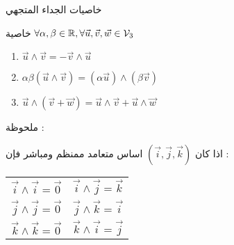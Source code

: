 \begin{frame}{خاصيات الجداء المتجهي }
\begin{small}
\begin{minipage}{.75\textwidth}
	
\begin{block}{خاصية}
	\centering
$ \forall \alpha ,\beta \in \mathbb{R} ,\forall \vec{ u},\vec{ v},\vec{ w} \in \mathcal{V}_3 $ \vspace{.5cm}
\begin{enumerate}[t]\RTListe
	\setlength \itemsep{.5cm}
\item 
$ \vec{u }  \land\vec{v }  = -\vec{v } \land\vec{u }  $
\item 
$ \alpha\beta (\vec{ u} \land\vec{v } )=(\alpha \vec{ u} ) \land(\beta\vec{v })     $  
\item 
$ \vec{u }  \land(\vec{ v}  + \vec{ w}  )=\vec{ u}  \land\vec{v }  + \vec{u}  \land \vec{ w} $
\end{enumerate}
\end{block}
\end{minipage}


ملحوظة : 

اذا كان  
$(\vec{i},\vec{j},\vec{k})$
اساس متعامد ممنظم ومباشر  فإن :

\begin{tabular}{l|l}
	$ \vec{ i}   \land \vec{i } =\vec{ 0} $	& 	$ \vec{ i}   \land \vec{j }  = \vec{k } $ \\ 
	$ \vec{ j}   \land \vec{j } =\vec{ 0}  $	& $	\vec{j }  \land  \vec{k } = \vec{i } $ \\ 
	$ \vec{ k}   \land \vec{k } =\vec{ 0}  $	&$	\vec{k }  \land  \vec{i }  = \vec{ j} $  \\ 
\end{tabular} 

\end{small}
\end{frame}

